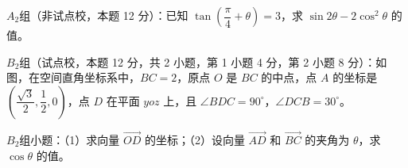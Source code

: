 \Needspace{0.4\textheight}
\begin{question}

$A_2$组（非试点校，本题 12 分）：已知 $\tan\left(\dfrac\pi4+\theta\right)=3$，求 $\sin2\theta-2\cos^2\theta$ 的值。

$B_2$组（试点校，本题 12 分，共 2 小题，第 1 小题 4 分，第 2 小题 8 分）：如图，在空间直角坐标系中，$BC=2$，原点 $O$ 是 $BC$ 的中点，点 $A$ 的坐标是 $\left(\dfrac{\sqrt3}{2},\dfrac12,0\right)$，点 $D$ 在平面 $yoz$ 上，且 $\angle BDC=90^\circ$，$\angle DCB=30^\circ$。
\nopagebreak[4]
\begin{center}\end{center}
\nopagebreak[4]
$B_2$组小题：（1）求向量 $\overrightarrow{OD}$ 的坐标；（2）设向量 $\overrightarrow{AD}$ 和 $\overrightarrow{BC}$ 的夹角为 $\theta$，求 $\cos\theta$ 的值。

\end{question}

